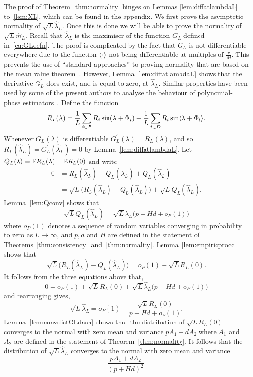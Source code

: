 \documentclass[journal]{IEEEtran}
\begin{document}
The proof of Theorem~\ref{thm:normality} hinges on Lemmas \ref{lem:diffatlambdaL} to~\ref{lem:XL}, which can be found in the appendix.  We first prove the asymptotic normality of $\sqrt{L} \hat{\lambda}_L$.  Once this is done we will be able to prove the normality of $\sqrt{L} \hat{m}_L$.  Recall that $\hat{\lambda}_L$ is the maximiser of the function $G_L$ defined in~\eqref{eq:GLdefn}.  The proof is complicated by the fact that $G_L$ is not differentiable everywhere due to the function $\left\langle \cdot \right\rangle$ not being differentiable at multiples of $\tfrac{\pi}{M}$.  This prevents the use of ``standard approaches'' to proving normality that are based on the mean value theorem~\cite{vonMises_diff_stats_1947,vanDerVart1971_asymptotic_stats,Pollard_new_ways_clts_1986,Pollard_conv_stat_proc_1984,Pollard_asymp_empi_proc_1989,van2009empirical}.  However, Lemma~\ref{lem:diffatlambdaL} shows that the derivative $G_L^\prime$ does exist, and is equal to zero, at $\hat{\lambda}_L$.  Similar properties have been used by some of the present authors to analyse the behaviour of polynomial-phase estimators~\cite{McKilliam_LSU_polyest_part_arxiv_2012}.  %
Define the function
\begin{equation}\label{eq:RLdef}
R_L(\lambda) = \frac{1}{L} \sum_{i \in P} R_i \sin(\lambda + \Phi_i) + \frac{1}{L} \sum_{i \in D} R_i \sin\langle \lambda + \Phi_i \rangle.
\end{equation}
Whenever $G_L(\lambda)$ is differentiable $G_L^\prime(\lambda) = R_L(\lambda)$, and so $R_L(\hat{\lambda}_L) = G_L^\prime(\hat{\lambda}_L) = 0$ by Lemma~\ref{lem:diffatlambdaL}.  Let $Q_L(\lambda) = {\mathbb E} R_L(\lambda) - {\mathbb E} R_L(0)$ and write
\begin{align*}
0 &= R_L(\hat{\lambda}_L) - Q_L(\hat{\lambda}_L) + Q_L(\hat{\lambda}_L) \\
&= \sqrt{L}\big( R_L(\hat{\lambda}_L) - Q_L(\hat{\lambda}_L) \big) + \sqrt{L}Q_L(\hat{\lambda}_L).
\end{align*}
Lemma~\ref{lem:Qconv} shows that
\[
\sqrt{L} Q_L(\hat{\lambda}_L) = \sqrt{L} \hat{\lambda}_L\big( p + Hd  + o_P(1) \big)
\]
where $o_P(1)$ denotes a sequence of random variables converging in probability to zero as $L \rightarrow \infty$, and $p,d$ and $H$ are defined in the statement of Theorems~\ref{thm:consistency}~and~\ref{thm:normality}.  Lemma~\ref{lem:empiricprocc} shows that
\[
\sqrt{L}\big( R_L(\hat{\lambda}_L) - Q_L(\hat{\lambda}_L) \big) = o_P(1) + \sqrt{L} R_L(0).
\]
It follows from the three equations above that,
\[
0 = o_P(1) + \sqrt{L}R_L(0) + \sqrt{L} \hat{\lambda}_L \big( p + Hd  + o_P(1) \big)
\]
and rearranging gives,
\[
\sqrt{L} \hat{\lambda}_L = o_P(1) - \frac{\sqrt{L}R_L(0)}{p + Hd  + o_P(1)}.
\]
Lemma~\ref{lem:convdistGLdash} shows that the distribution of $\sqrt{L}R_L(0)$ converges to the normal with zero mean and variance $pA_1 + dA_2$ where $A_1$ and $A_2$ are defined in the statement of Theorem~\ref{thm:normality}.  It follows that the distribution of $\sqrt{L}\hat{\lambda}_L$ converges to the normal with zero mean and variance
\[
\frac{pA_1 + dA_2}{(p + Hd)^2}.
\]
 
\end{document}
